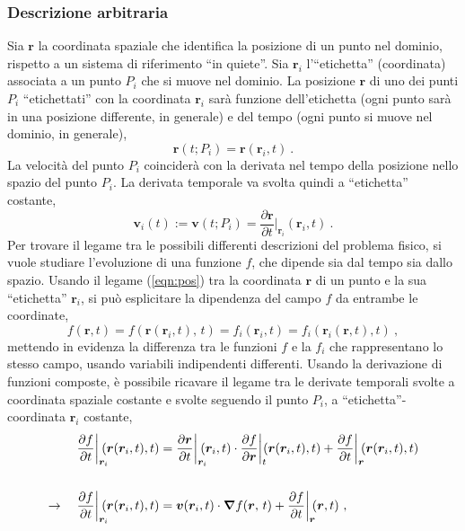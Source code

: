 \subsubsection{Descrizione arbitraria}
Sia $\bm{r}$ la coordinata spaziale che identifica la posizione di un punto nel dominio, rispetto a un sistema di riferimento ``in quiete''. Sia $\bm{r}_{i}$ l'``etichetta'' (coordinata) associata a un punto $P_i$ che si muove nel dominio.
La posizione $\bm{r}$ di uno dei punti $P_i$ ``etichettati'' con la coordinata $\bm{r}_{i}$ sarà funzione dell'etichetta (ogni punto sarà in una posizione differente, in generale) e del tempo (ogni punto si muove nel dominio, in generale),
\begin{equation}\label{eqn:pos}
    \bm{r}(t; P_i) = \bm{r}(\bm{r}_{i}, t) \ .
\end{equation}
La velocità del punto $P_i$ coinciderà con la derivata nel tempo della posizione nello spazio del punto $P_i$. La derivata temporale va svolta quindi a ``etichetta'' costante,
\begin{equation}\label{eqn:vel}
    \bm{v}_i(t) := \bm{v}(t; P_i) = \frac{\partial \bm{r}}{\partial t}\bigg|_{\bm{r}_{i}}(\bm{r}_{i}, t) \ .
\end{equation}
Per trovare il legame tra le possibili differenti descrizioni del problema fisico, si vuole studiare l'evoluzione di una funzione $f$, che dipende sia dal tempo sia dallo spazio. Usando il legame (\ref{eqn:pos}) tra la coordinata $\bm{r}$ di un punto e la sua ``etichetta'' $\bm{r}_i$, si può esplicitare la dipendenza del campo $f$ da entrambe le coordinate,
\begin{equation}
    f(\bm{r}, t) = f\left( \bm{r} (\bm{r}_i,t), \, t\right) 
    = f_i\left(\bm{r}_i, t\right) = f_i\left( \bm{r}_i (\bm{r}, t), t \right) \ ,
\end{equation}
mettendo in evidenza la differenza tra le funzioni $f$ e la $f_i$ che rappresentano lo stesso campo, usando variabili indipendenti differenti. Usando la derivazione di funzioni composte, è possibile ricavare il legame tra le derivate temporali svolte a coordinata spaziale costante e svolte seguendo il punto $P_i$, a ``etichetta''-coordinata $\bm{r}_i$ costante,
\begin{equation}
\begin{aligned}
    \frac{\partial f}{\partial t}\bigg|_{\bm{r}_i} \hspace{-0.2cm}(\bm{r}(\bm{r}_i,t), t)  & = 
    \frac{\partial \bm{r}}{\partial t}\bigg|_{\bm{r}_i} \hspace{-0.2cm}(\bm{r}_i,t) \cdot \frac{\partial f}{\partial \bm{r}}\bigg|_t \hspace{-0.1cm}(\bm{r}(\bm{r}_i,t), t) +
    \frac{\partial f}{\partial t}\bigg|_{\bm{r}}\hspace{-0.1cm}(\bm{r}(\bm{r}_i,t), t) \\ \\
    \rightarrow \quad 
    \frac{\partial f}{\partial t}\bigg|_{\bm{r}_i} \hspace{-0.2cm}(\bm{r}(\bm{r}_i,t), t) & = \bm{v}(\bm{r}_i, t) \cdot \bm{\nabla} f(\bm{r}, \, t) + \frac{\partial f}{\partial t}\bigg|_{\bm{r}}\hspace{-0.1cm}(\bm{r}, t) \ ,
\end{aligned}
\end{equation}
